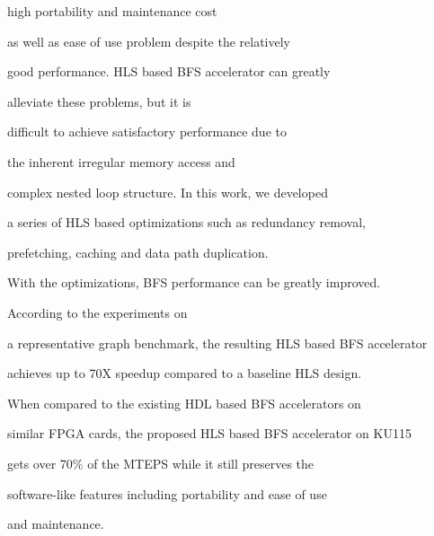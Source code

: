 high portability and maintenance cost 

as well as ease of use problem despite the relatively 

good performance. HLS based BFS accelerator can greatly 

alleviate these problems, but it is 

difficult to achieve satisfactory performance due to 

the inherent irregular memory access and 

complex nested loop structure. In this work, we developed 

a series of HLS based optimizations such as redundancy removal, 

prefetching, caching and data path duplication. 

With the optimizations, BFS performance can be greatly improved. 

According to the experiments on 

a representative graph benchmark, the resulting HLS based BFS accelerator 

achieves up to 70X speedup compared to a baseline HLS design. 

When compared to the existing HDL based BFS accelerators on 

similar FPGA cards, the proposed HLS based BFS accelerator on KU115 

gets over 70\% of the MTEPS while it still preserves the 

software-like features including portability and ease of use 

and maintenance.  
